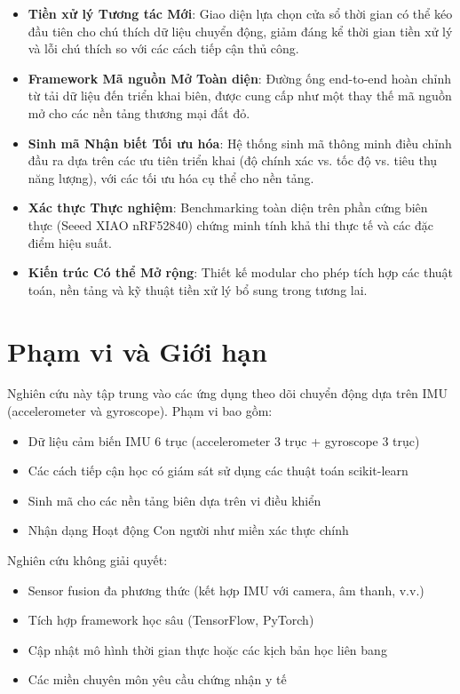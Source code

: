 \begin{itemize}
\item \textbf{Tiền xử lý Tương tác Mới}: Giao diện lựa chọn cửa sổ thời gian có thể kéo đầu tiên cho chú thích dữ liệu chuyển động, giảm đáng kể thời gian tiền xử lý và lỗi chú thích so với các cách tiếp cận thủ công.

\item \textbf{Framework Mã nguồn Mở Toàn diện}: Đường ống end-to-end hoàn chỉnh từ tải dữ liệu đến triển khai biên, được cung cấp như một thay thế mã nguồn mở cho các nền tảng thương mại đắt đỏ.

\item \textbf{Sinh mã Nhận biết Tối ưu hóa}: Hệ thống sinh mã thông minh điều chỉnh đầu ra dựa trên các ưu tiên triển khai (độ chính xác vs. tốc độ vs. tiêu thụ năng lượng), với các tối ưu hóa cụ thể cho nền tảng.

\item \textbf{Xác thực Thực nghiệm}: Benchmarking toàn diện trên phần cứng biên thực (Seeed XIAO nRF52840) chứng minh tính khả thi thực tế và các đặc điểm hiệu suất.

\item \textbf{Kiến trúc Có thể Mở rộng}: Thiết kế modular cho phép tích hợp các thuật toán, nền tảng và kỹ thuật tiền xử lý bổ sung trong tương lai.
\end{itemize}

\section{Phạm vi và Giới hạn}

Nghiên cứu này tập trung vào các ứng dụng theo dõi chuyển động dựa trên IMU (accelerometer và gyroscope). Phạm vi bao gồm:

\begin{itemize}
\item Dữ liệu cảm biến IMU 6 trục (accelerometer 3 trục + gyroscope 3 trục)
\item Các cách tiếp cận học có giám sát sử dụng các thuật toán scikit-learn
\item Sinh mã cho các nền tảng biên dựa trên vi điều khiển
\item Nhận dạng Hoạt động Con người như miền xác thực chính
\end{itemize}

Nghiên cứu không giải quyết:

\begin{itemize}
\item Sensor fusion đa phương thức (kết hợp IMU với camera, âm thanh, v.v.)
\item Tích hợp framework học sâu (TensorFlow, PyTorch)
\item Cập nhật mô hình thời gian thực hoặc các kịch bản học liên bang
\item Các miền chuyên môn yêu cầu chứng nhận y tế
\end{itemize}

